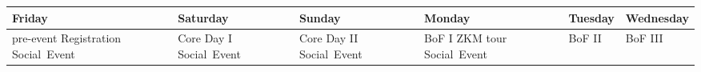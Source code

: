 \begin{tabularx}{\linewidth}{X|X|X|X|X|X}
\bf Friday & \bf Saturday & \bf Sunday & \bf Monday & \bf Tuesday & \bf Wednesday \\\hline
  pre-event \newline
  Registration \newline
  Social~Event
 &
  Core Day I \newline
  Social~Event
 &
  Core Day II \newline
  Social~Event
 &
  BoF I \newline
  ZKM tour \newline
  Social~Event
 &
  BoF II
 &
  BoF III
\end{tabularx}

\newpage







